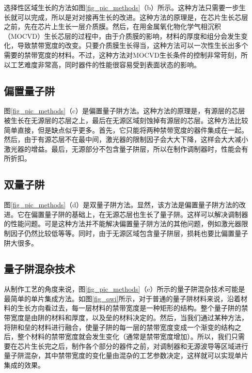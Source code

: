 \documentclass{ZJUthesis}
\begin{document}
选择性区域生长的方法如图\ref{fig_pic_methods}（b）所示。这种方法只需要一步生长就可以完成，所以是对对接再生长的改进。这种方法的原理是，在芯片生长芯层之前，先在芯片上生长一层介质膜。然后，在用金属氧化物化学气相沉积（MOCVD）生长芯层的过程中，由于介质膜的影响，材料的厚度和组分会发生变化，导致禁带宽度的改变。只要介质膜生长得当，这种方法可以一次性生长出多个需要的禁带宽度的材料。不过，这种方法对MOCVD生长条件的控制非常苛刻，所以工艺难度非常高，同时器件的性能很容易受到表面状态的影响。

\subsection{偏置量子阱}

图\ref{fig_pic_methods}（c）是偏置量子阱方法。这种方法的原理是，有源层的芯层被生长在无源层的芯层之上，最后在无源区域刻蚀掉有源层的芯层。这种方法比较简单直接，但是缺点似乎更多。首先，它只能将两种禁带宽度的器件集成在一起。然后，由于有源芯层不在最中间，激光器的限制因子会大大下降，这样会大大减小激光器的增益。最后，无源部分不包含量子阱层，所以在制作调制器时，性能会有所折扣。

\subsection{双量子阱}

图\ref{fig_pic_methods}（d）是双量子阱方法。显然，该方法是偏置量子阱方法的改进。它在偏置量子阱的基础上，在无源芯层也生长了量子阱。这样可以解决调制器的性能问题。可是这种方法并不能解决偏置量子阱方法的其他问题，例如激光器限制因子仍然比较低等等。同时，由于无源区域包含量子阱层，损耗也要比偏置量子阱大很多。

\subsection{量子阱混杂技术}

从制作工艺的角度来说，图\ref{fig_pic_methods}（e）所示的量子阱混杂技术可能是最简单的单片集成方法。如图\ref{fig_qwi}所示，对于普通的量子阱材料来说，沿着材料的生长方向看过去，每一层材料的禁带宽度是一种矩形的结构。整个量子阱的禁带宽度是由阱的材料和厚度，以及垒的材料决定的。然后，当我们通过某种方法，将阱和垒的材料进行融合，使量子阱的每一层的禁带宽度变成一个渐变的结构之后，整个材料的禁带宽度就会发生变化（通常是禁带宽度增加）。所以，我们只需要在芯片生长完之后，制作各个部分的器件之前，对调制器和无源波导等区域进行量子阱混杂，其中禁带宽度的变化量由混杂的工艺参数决定，这样就可以实现单片集成的效果。
\end{document}
